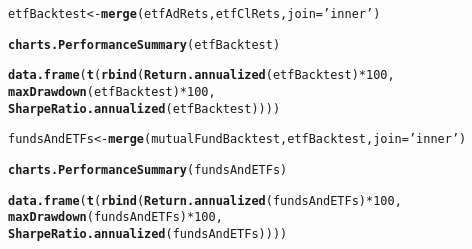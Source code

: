 \documentclass[12pt, a4paper, oneside]{article}\usepackage[]{graphicx}\usepackage[]{color}
\makeatletter
\newcommand{\hlnum}[1]{\textcolor[rgb]{0.686,0.059,0.569}{#1}}%
\newcommand{\hlstr}[1]{\textcolor[rgb]{0.192,0.494,0.8}{#1}}%
\newcommand{\hlopt}[1]{\textcolor[rgb]{0,0,0}{#1}}%
\newcommand{\hlstd}[1]{\textcolor[rgb]{0.345,0.345,0.345}{#1}}%
\newcommand{\hlkwb}[1]{\textcolor[rgb]{0.69,0.353,0.396}{#1}}%
\newcommand{\hlkwc}[1]{\textcolor[rgb]{0.333,0.667,0.333}{#1}}%
\newcommand{\hlkwd}[1]{\textcolor[rgb]{0.737,0.353,0.396}{\textbf{#1}}}%
\newenvironment{kframe}{%
 \def\at@end@of@kframe{}%
 \ifinner\ifhmode%
  \def\at@end@of@kframe{\end{minipage}}%
  \begin{minipage}{\columnwidth}%
 \fi\fi%
 \def\FrameCommand##1{\hskip\@totalleftmargin \hskip-\fboxsep
 \colorbox{shadecolor}{##1}\hskip-\fboxsep
     \hskip-\linewidth \hskip-\@totalleftmargin \hskip\columnwidth}%
 \MakeFramed {\advance\hsize-\width
   \@totalleftmargin\z@ \linewidth\hsize
   \@setminipage}}%
 {\par\unskip\endMakeFramed%
 \at@end@of@kframe}
\newenvironment{knitrout}{}{} %
\makeatother
\begin{document}
\begin{knitrout}
\color{fgcolor}\begin{kframe}
\begin{alltt}
\hlstd{etfBacktest} \hlkwb{<-} \hlkwd{merge}\hlstd{(etfAdRets, etfClRets,} \hlkwc{join}\hlstd{=}\hlstr{'inner'}\hlstd{)}
\end{alltt}


{\ttfamily\noindent\bfseries{}}\begin{alltt}
\hlkwd{charts.PerformanceSummary}\hlstd{(etfBacktest)}
\end{alltt}


{\ttfamily\noindent\bfseries{}}\begin{alltt}
\hlkwd{data.frame}\hlstd{(}\hlkwd{t}\hlstd{(}\hlkwd{rbind}\hlstd{(}\hlkwd{Return.annualized}\hlstd{(etfBacktest)}\hlopt{*}\hlnum{100}\hlstd{,}
                   \hlkwd{maxDrawdown}\hlstd{(etfBacktest)}\hlopt{*}\hlnum{100}\hlstd{,}
                   \hlkwd{SharpeRatio.annualized}\hlstd{(etfBacktest))))}
\end{alltt}


{\ttfamily\noindent\bfseries\color{errorcolor}{\#\# Error in is.vector(R): object 'etfBacktest' not found}}\end{kframe}
\end{knitrout}

\begin{knitrout}
\color{fgcolor}\begin{kframe}
\begin{alltt}
\hlstd{fundsAndETFs} \hlkwb{<-} \hlkwd{merge}\hlstd{(mutualFundBacktest, etfBacktest,} \hlkwc{join}\hlstd{=}\hlstr{'inner'}\hlstd{)}
\end{alltt}


{\ttfamily\noindent\bfseries{}}\begin{alltt}
\hlkwd{charts.PerformanceSummary}\hlstd{(fundsAndETFs)}
\end{alltt}


{\ttfamily\noindent\bfseries{}}\begin{alltt}
\hlkwd{data.frame}\hlstd{(}\hlkwd{t}\hlstd{(}\hlkwd{rbind}\hlstd{(}\hlkwd{Return.annualized}\hlstd{(fundsAndETFs)}\hlopt{*}\hlnum{100}\hlstd{,}
                   \hlkwd{maxDrawdown}\hlstd{(fundsAndETFs)}\hlopt{*}\hlnum{100}\hlstd{,}
                   \hlkwd{SharpeRatio.annualized}\hlstd{(fundsAndETFs))))}
\end{alltt}


{\ttfamily\noindent\bfseries\color{errorcolor}{\#\# Error in is.vector(R): object 'fundsAndETFs' not found}}\end{kframe}
\end{knitrout}
\end{document}
